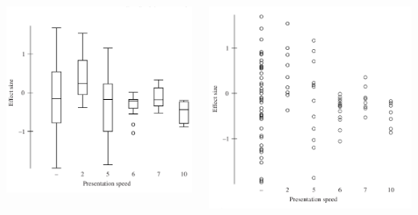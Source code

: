 \documentclass{beamer}
\begin{document}
\begin{frame}
  \begin{columns}
    \begin{column}{.5\textwidth}
      \begin{center}
        \includegraphics[width=\textwidth]{EDA/eda-boxplot2}
      \end{center}
    \end{column}
    \begin{column}{.5\textwidth}
      \begin{center}
        \includegraphics[width=\textwidth]{EDA/eda-boxplot1}
      \end{center}
    \end{column}
  \end{columns}
\end{frame}
\end{document}
